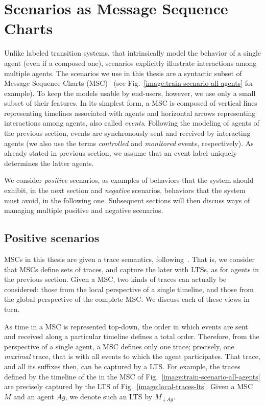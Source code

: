 \section{Scenarios as Message Sequence Charts\label{section:background-scenarios}}

Unlike labeled transition systems, that intrinsically model the behavior of a single agent (even if a composed one), scenarios explicitly illustrate interactions among multiple agents. The scenarios we use in this thesis are a syntactic subset of Message Sequence Charts (MSC)~\cite{ITU:1996} (see Fig.~\ref{image:train-scenario-all-agents} for example). To keep the models usable by end-users, however, we use only a small subset of their features. In its simplest form, a MSC is composed of vertical lines representing timelines associated with agents and horizontal arrows representing interactions among agents, also called \emph{events}. Following the modeling of agents of the previous section, events are synchronously sent and received by interacting agents (we also use the terms \emph{controlled} and \emph{monitored} events, respectively). As already stated in previous section, we assume that an event label uniquely determines the latter agents. 

We consider \emph{positive} scenarios, as examples of behaviors that the system should exhibit, in the next section and \emph{negative} scenarios, behaviors that the system must avoid, in the following one. Subsequent sections will then discuss ways of managing multiple positive and negative scenarios. 

\subsection{Positive scenarios\label{subsection:background-positive-scenarios}}

MSCs in this thesis are given a trace semantics, following~\cite{Uchitel:2004}. That is, we consider that MSCs define sets of traces, and capture the later with LTSs, as for agents in the previous section. Given a MSC, two kinds of traces can actually be considered: those from the local perspective of a single timeline, and those from the global perspective of the complete MSC. We discuss each of these views in turn.

As time in a MSC is represented top-down, the order in which events are sent and received along a particular timeline defines a total order. Therefore, from the perspective of a single agent, a MSC defines only one trace; precisely, one \emph{maximal} trace, that is with all events to which the agent participates. That trace, and all its suffixes then, can be captured by a LTS. For example, the traces defined by the timeline of the  in the MSC of Fig.~\ref{image:train-scenario-all-agents} are precisely captured by the LTS of Fig.~\ref{image:local-traces-lts}. Given a MSC $M$ and an agent $Ag$, we denote such an LTS by $M_{\downarrow Ag}$.

